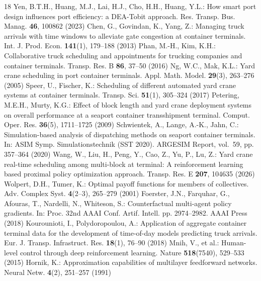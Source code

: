 \documentclass[a4paper]{llncs}
\begin{document}
\small
\begin{thebibliography}{18}
\setlength{\itemsep}{0pt}
\setlength{\parsep}{0pt}
\setlength{\topsep}{2pt}
 Yen, B.T.H., Huang, M.J., Lai, H.J., Cho, H.H., Huang, Y.L.: How smart port design influences port efficiency: a DEA-Tobit approach. Res. Transp. Bus. Manag. \textbf{46}, 100862 (2023)
 Chen, G., Govindan, K., Yang, Z.: Managing truck arrivals with time windows to alleviate gate congestion at container terminals. Int. J. Prod. Econ. \textbf{141}(1), 179--188 (2013)
 Phan, M.-H., Kim, K.H.: Collaborative truck scheduling and appointments for trucking companies and container terminals. Transp. Res. B \textbf{86}, 37--50 (2016)
 Ng, W.C., Mak, K.L.: Yard crane scheduling in port container terminals. Appl. Math. Model. \textbf{29}(3), 263--276 (2005)
 Speer, U., Fischer, K.: Scheduling of different automated yard crane systems at container terminals. Transp. Sci. \textbf{51}(1), 305--324 (2017)
 Petering, M.E.H., Murty, K.G.: Effect of block length and yard crane deployment systems on overall performance at a seaport container transshipment terminal. Comput. Oper. Res. \textbf{36}(5), 1711--1725 (2009)
 Schwientek, A., Lange, A.-K., Jahn, C.: Simulation-based analysis of dispatching methods on seaport container terminals. In: ASIM Symp. Simulationstechnik (SST 2020). ARGESIM Report, vol.~59, pp. 357--364 (2020)
 Wang, W., Liu, H., Peng, Y., Cao, Z., Yu, P., Lu, Z.: Yard crane real-time scheduling among multi-block at terminal: A reinforcement learning based proximal policy optimization approach. Transp. Res. E \textbf{207}, 104635 (2026)
 Wolpert, D.H., Tumer, K.: Optimal payoff functions for members of collectives. Adv. Complex Syst. \textbf{4}(2--3), 265--279 (2001)
 Foerster, J.N., Farquhar, G., Afouras, T., Nardelli, N., Whiteson, S.: Counterfactual multi-agent policy gradients. In: Proc. 32nd AAAI Conf. Artif. Intell. pp. 2974--2982. AAAI Press (2018)
 Kourounioti, I., Polydoropoulou, A.: Application of aggregate container terminal data for the development of time-of-day models predicting truck arrivals. Eur. J. Transp. Infrastruct. Res. \textbf{18}(1), 76--90 (2018)
 Mnih, V., et al.: Human-level control through deep reinforcement learning. Nature \textbf{518}(7540), 529--533 (2015)
 Hornik, K.: Approximation capabilities of multilayer feedforward networks. Neural Netw. \textbf{4}(2), 251--257 (1991)

\end{thebibliography}
\end{document}
